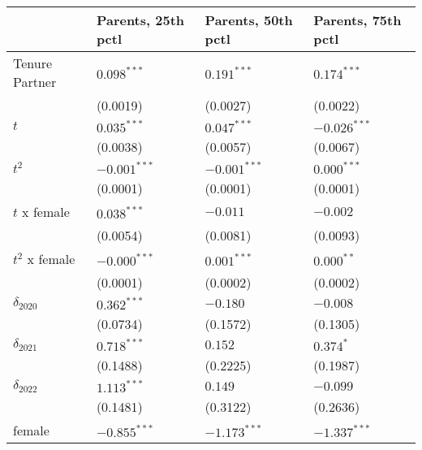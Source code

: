 \begin{tabular}{llll}
\toprule
{} & Parents, 25th pctl & Parents, 50th pctl & Parents, 75th pctl \\
\midrule
Tenure Partner                         &      $0.098^{***}$ &      $0.191^{***}$ &      $0.174^{***}$ \\
                                       &           (0.0019) &           (0.0027) &           (0.0022) \\
$t$                                    &      $0.035^{***}$ &      $0.047^{***}$ &     $-0.026^{***}$ \\
                                       &           (0.0038) &           (0.0057) &           (0.0067) \\
$t^2$                                  &     $-0.001^{***}$ &     $-0.001^{***}$ &      $0.000^{***}$ \\
                                       &           (0.0001) &           (0.0001) &           (0.0001) \\
$t$ x female                           &      $0.038^{***}$ &           $-0.011$ &           $-0.002$ \\
                                       &           (0.0054) &           (0.0081) &           (0.0093) \\
$t^2$ x female                         &     $-0.000^{***}$ &      $0.001^{***}$ &       $0.000^{**}$ \\
                                       &           (0.0001) &           (0.0002) &           (0.0002) \\
$\delta_{2020}$                        &      $0.362^{***}$ &           $-0.180$ &           $-0.008$ \\
                                       &           (0.0734) &           (0.1572) &           (0.1305) \\
$\delta_{2021}$                        &      $0.718^{***}$ &            $0.152$ &          $0.374^*$ \\
                                       &           (0.1488) &           (0.2225) &           (0.1987) \\
$\delta_{2022}$                        &      $1.113^{***}$ &            $0.149$ &           $-0.099$ \\
                                       &           (0.1481) &           (0.3122) &           (0.2636) \\
female                                 &     $-0.855^{***}$ &     $-1.173^{***}$ &     $-1.337^{***}$ \\

\end{tabular}
